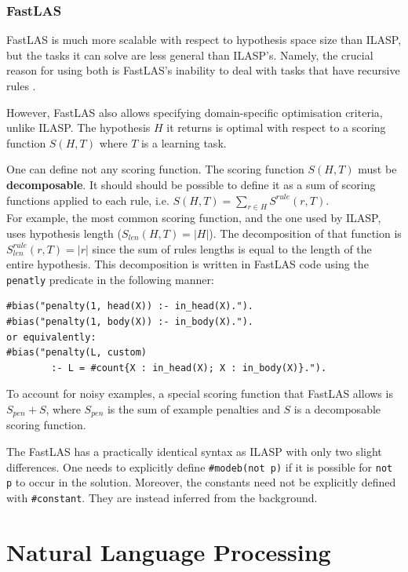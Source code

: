 \subsubsection{FastLAS}
\label{fastlas-background}

FastLAS is much more scalable with respect to hypothesis space size than ILASP, but the tasks it can solve are less general than ILASP's.
Namely, the crucial reason for using both is FastLAS's inability to deal with tasks that have recursive rules \cite{RefWorks:RefID:82-law2021scalable}.

However, FastLAS also allows specifying domain-specific optimisation criteria, unlike ILASP. 
The hypothesis $H$ it returns is optimal with respect to a scoring function $S(H, T)$ where $T$ is a learning task.

One can define not any scoring function.
The scoring function $S(H, T)$ must be \textbf{decomposable}.
It should should be possible to define it as a sum of scoring functions applied to each rule, i.e. $S(H, T) = \sum_{r \in H} S^{rule}(r, T)$. \\
For example, the most common scoring function, and the one used by ILASP, uses hypothesis length ($S_{len}(H, T) = |H|$).
The decomposition of that function is $S_{len}^{rule}(r, T) = |r|$ since the sum of rules lengths is equal to the length of the entire hypothesis. 
This decomposition is written in FastLAS code using the \verb_penatly_ predicate in the following manner:
\begin{verbatim}
#bias("penalty(1, head(X)) :- in_head(X).").
#bias("penalty(1, body(X)) :- in_body(X).").
or equivalently:
#bias("penalty(L, custom) 
        :- L = #count{X : in_head(X); X : in_body(X)}.").
\end{verbatim} 

To account for noisy examples, a special scoring function that FastLAS allows is $S_{pen} + S$, where $S_{pen}$ is the sum of example penalties and $S$ is a decomposable scoring function.

The FastLAS has a practically identical syntax as ILASP with only two slight differences.
One needs to explicitly define \verb+#modeb(not p)+ if it is possible for \verb+not p+ to occur in the solution.
Moreover, the constants need not be explicitly defined with \verb+#constant+. They are instead inferred from the background.


\section{Natural Language Processing}

